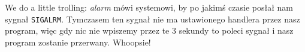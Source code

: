 We do a little trolling: \textit{alarm} mówi systemowi, by po jakimś czasie posłał nam sygnał \texttt{SIGALRM}. Tymczasem ten sygnał nie ma ustawionego handlera przez nasz program, więc gdy nic nie wpiszemy przez te 3 sekundy to poleci sygnał i nasz program zostanie przerwany. Whoopsie!
